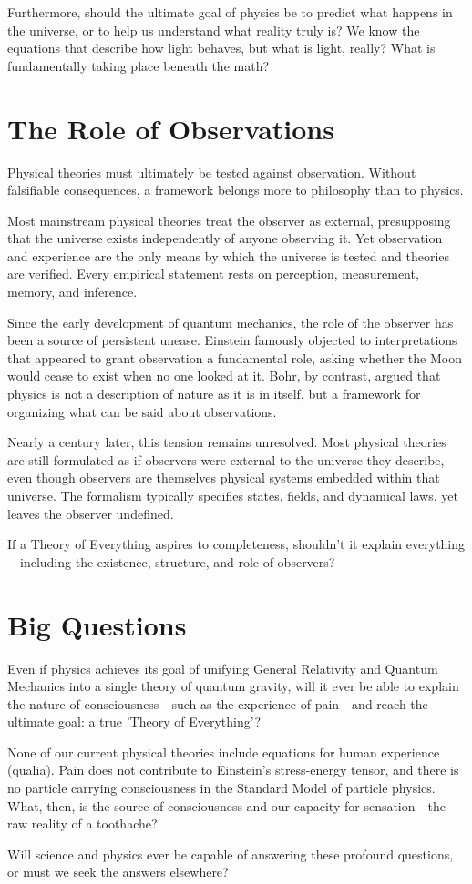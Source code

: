 Furthermore, should the ultimate goal of physics be to predict what happens in the universe, or to help us understand what reality truly is? 
We know the equations that describe how light behaves, but what is light, really? What is fundamentally taking place beneath the math?




\section{The Role of Observations}

Physical theories must ultimately be tested against observation. Without falsifiable consequences, a framework belongs more to philosophy than to physics.

Most mainstream physical theories treat the observer as external, presupposing that the universe exists independently of anyone observing it. 
Yet observation and experience are the only means by which the universe is tested and theories are verified. 
Every empirical statement rests on perception, measurement, memory, and inference.

Since the early development of quantum mechanics, the role of the observer has been a source of persistent unease. 
Einstein famously objected to interpretations that appeared to grant observation a fundamental role, asking whether the Moon would cease to exist when no one looked at it. 
Bohr, by contrast, argued that physics is not a description of nature as it is in itself, but a framework for organizing what can be said about observations.

Nearly a century later, this tension remains unresolved. Most physical theories are still formulated as if observers were external to the universe they describe, 
even though observers are themselves physical systems embedded within that universe. The formalism typically specifies states, fields, and dynamical laws, yet leaves the observer undefined.

If a Theory of Everything aspires to completeness, shouldn't it explain everything—including the existence, structure, and role of observers?



\section{Big Questions}

Even if physics achieves its goal of unifying General Relativity and Quantum Mechanics into a single theory of quantum gravity, 
will it ever be able to explain the nature of consciousness—such as the experience of pain—and reach the ultimate goal: a true 'Theory of Everything'?

None of our current physical theories include equations for human experience (qualia). Pain does not contribute to Einstein’s stress-energy tensor, 
and there is no particle carrying consciousness in the Standard Model of particle physics. 
What, then, is the source of consciousness and our capacity for sensation—the raw reality of a toothache?

Will science and physics ever be capable of answering these profound questions, or must we seek the answers elsewhere?
